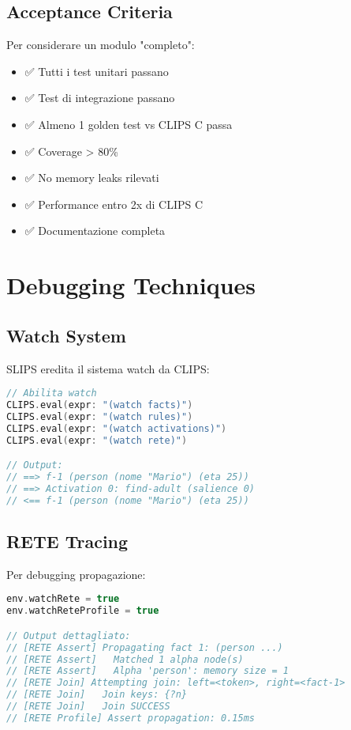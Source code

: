 \subsection{Acceptance Criteria}

Per considerare un modulo "completo":

\begin{itemize}
\item ✅ Tutti i test unitari passano
\item ✅ Test di integrazione passano
\item ✅ Almeno 1 golden test vs CLIPS C passa
\item ✅ Coverage > 80\%
\item ✅ No memory leaks rilevati
\item ✅ Performance entro 2x di CLIPS C
\item ✅ Documentazione completa
\end{itemize}

\section{Debugging Techniques}

\subsection{Watch System}

SLIPS eredita il sistema watch da CLIPS:

\begin{lstlisting}[language=Swift]
// Abilita watch
CLIPS.eval(expr: "(watch facts)")
CLIPS.eval(expr: "(watch rules)")
CLIPS.eval(expr: "(watch activations)")
CLIPS.eval(expr: "(watch rete)")

// Output:
// ==> f-1 (person (nome "Mario") (eta 25))
// ==> Activation 0: find-adult (salience 0)
// <== f-1 (person (nome "Mario") (eta 25))
\end{lstlisting}

\subsection{RETE Tracing}

Per debugging propagazione:

\begin{lstlisting}[language=Swift]
env.watchRete = true
env.watchReteProfile = true

// Output dettagliato:
// [RETE Assert] Propagating fact 1: (person ...)
// [RETE Assert]   Matched 1 alpha node(s)
// [RETE Assert]   Alpha 'person': memory size = 1
// [RETE Join] Attempting join: left=<token>, right=<fact-1>
// [RETE Join]   Join keys: {?n}
// [RETE Join]   Join SUCCESS
// [RETE Profile] Assert propagation: 0.15ms
\end{lstlisting}

